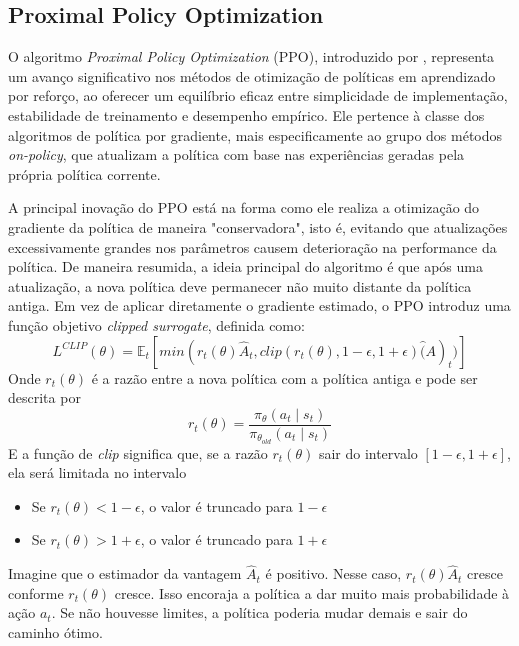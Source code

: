 \subsection{Proximal Policy Optimization}
O algoritmo \textit{Proximal Policy Optimization} (PPO), introduzido por , 
representa um avanço significativo nos métodos de otimização de políticas em aprendizado por reforço, 
ao oferecer um equilíbrio eficaz entre simplicidade de implementação, estabilidade de treinamento e desempenho empírico. 
Ele pertence à classe dos algoritmos de política por gradiente, mais especificamente ao grupo dos métodos \textit{on-policy}, 
que atualizam a política com base nas experiências geradas pela própria política corrente.

A principal inovação do PPO está na forma como ele realiza a otimização do gradiente da política de maneira "conservadora", 
isto é, evitando que atualizações excessivamente grandes nos parâmetros causem deterioração na performance da política. 
De maneira resumida, a ideia principal do algoritmo é que após uma atualização,
a nova política deve permanecer não muito distante da política antiga.
Em vez de aplicar diretamente o gradiente estimado, o PPO introduz uma função objetivo \textit{clipped surrogate}, definida como:
\begin{equation}
    L^{CLIP} (\theta) = \mathbb{E}_{t} \left[ min(r_{t}(\theta)\hat{A}_{t}, clip(r_{t}(\theta), 1 - \epsilon, 1 + \epsilon)\hat(A)_{t})\right]
\end{equation}
\noindent Onde \(r_{t}(\theta)\) é a razão entre a nova política com a política antiga e pode ser descrita por
\begin{equation}
    r_{t}(\theta) = \frac{\pi_{\theta}(a_{t} \mid s_{t})}{\pi_{\theta_{old}}(a_{t} \mid s_{t})}
\end{equation}
\noindent E a função de \textit{clip} significa que, se a razão \(r_{t}(\theta)\) sair do intervalo \([1-\epsilon, 1+\epsilon]\),
ela será limitada no intervalo
\begin{itemize}
    \item Se \(r_{t}(\theta) < 1 - \epsilon\), o valor é truncado para \(1 - \epsilon\)
    \item Se \(r_{t}(\theta) > 1 + \epsilon\), o valor é truncado para \(1 + \epsilon\)
\end{itemize}
Imagine que o estimador da vantagem \(\hat{A}_{t}\) é positivo. Nesse caso, \(r_{t}(\theta)\hat{A}_{t}\) 
cresce conforme \(r_{t}(\theta)\) cresce. Isso encoraja a política a dar muito mais probabilidade à ação 
\(a_{t}\). Se não houvesse limites, a política poderia mudar demais e sair do caminho ótimo.

